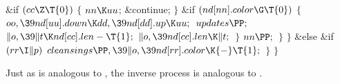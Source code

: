 \&{if} ${}(\\{cc}\Z\T{0}){}$\5
${}\{{}$\1\6
${}\\{nn}\K\\{uu}{}$;\5
\&{continue};\6
\4${}\}{}$\2\6
\&{if} ${}(\\{nd}[\\{nn}].\\{color}\G\T{0}){}$\5
${}\{{}$\1\6
${}\\{oo},\39\\{nd}[\\{uu}].\\{down}\K\\{dd},\39\\{nd}[\\{dd}].\\{up}\K%
\\{uu};{}$\6
${}\\{updates}\PP;{}$\6
${}\|o,\39\|t\K\\{nd}[\\{cc}].\\{len}-\T{1};{}$\6
${}\|o,\39\\{nd}[\\{cc}].\\{len}\K\|t;{}$\6
\4${}\}{}$\2\6
${}\\{nn}\PP;{}$\6
\4${}\}{}$\2\6
\4${}\}{}$\5
\2\&{else} \&{if} ${}(\\{rr}\I\|p){}$\1\5
${}\\{cleansings}\PP,\39\|o,\39\\{nd}[\\{rr}].\\{color}\K{-}\T{1};{}$\2\6
\4${}\}{}$\2\6
\4${}\}{}$\2\par
\fi

Just as  is analogous to , the inverse
process is
analogous to .

